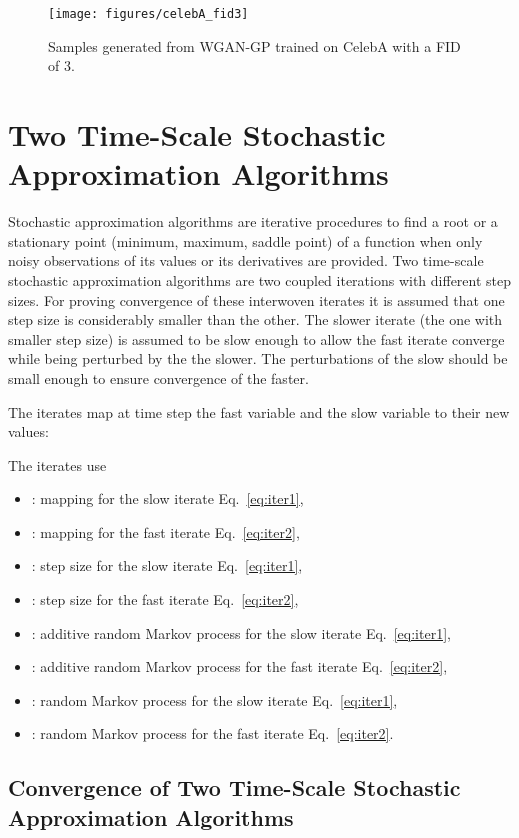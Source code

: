 \documentclass{article}
\begin{document}
\begin{figure}[H]
\texttt{[image: figures/celebA\_fid3]}
\caption[CelebA Samples with FID 3]{Samples generated from WGAN-GP
trained on CelebA with a FID of 3.
  \label{fig:fid4} }
\end{figure}

\section{Two Time-Scale Stochastic Approximation Algorithms}
\label{sec:background}

Stochastic approximation algorithms are iterative procedures to find
a root or a stationary point (minimum, maximum, saddle point) of a
function when only noisy observations of its values or its
derivatives are provided.
Two time-scale stochastic approximation algorithms are two coupled
iterations with different step sizes. For proving convergence of these
interwoven iterates it is assumed that one
step size is considerably smaller than the other.
The slower iterate (the one with smaller step size) is assumed to be
slow enough to allow the fast iterate converge while being perturbed
by the the slower. The perturbations of the slow should be small
enough to ensure convergence of the faster.



The iterates map at time step  the fast variable  and the slow
variable  to their new values:


The iterates use
\begin{itemize}
\item :
mapping for the slow iterate Eq.~\eqref{eq:iter1},
\item :
mapping for the fast iterate Eq.~\eqref{eq:iter2},
\item :
step size for the slow iterate Eq.~\eqref{eq:iter1},
\item :
step size for the fast iterate Eq.~\eqref{eq:iter2},
\item :
additive random Markov process for the slow iterate
Eq.~\eqref{eq:iter1},
\item :
additive random Markov process for the fast iterate
Eq.~\eqref{eq:iter2},
\item :
random Markov process for the slow iterate
Eq.~\eqref{eq:iter1},
\item :
random Markov process for the fast iterate
Eq.~\eqref{eq:iter2}.
\end{itemize}


\subsection{Convergence of Two Time-Scale Stochastic Approximation Algorithms}
\label{sec:convergence}
\end{document}
